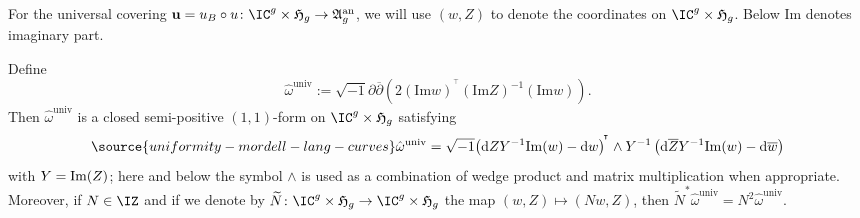 For the universal covering $\mathbf{u} = u_B\circ u \colon \IC^g
\times \mathfrak{H}_g \rightarrow \mathfrak{A}_g^{\mathrm{an}}$, we
will use $(w,Z)$ to denote the coordinates on $\IC^g \times
\mathfrak{H}_g$.
Below $\mathrm{Im}$ denotes imaginary part.


\begin{lemma}
\notready\label{LemmaBettiOnUniversalCovering}
Define
\[
\hat{\omega}^{\mathrm{univ}}:=\sqrt{-1}\partial \overline{\partial} \left( 2 (\mathrm{Im}w)^{\!^{\intercal}} (\mathrm{Im} Z)^{-1} (\mathrm{Im}w) \right).
\]
Then $\hat{\omega}^{\mathrm{univ}}$ is a closed  semi-positive
$(1,1)$-form on $\IC^g\times\mathfrak{H}_g$ satisfying %
\begin{equation}
  \label{eq:bettiformaltformula}
\source{uniformity-mordell-lang-curves}
  \hat{\omega}^{\mathrm{univ}} = \sqrt{-1} \tran{\left( \rmd Z \Y^{-1}
      \mathrm{Im}(w) - \rmd w\right)} \wedge \Y^{-1} \left( \rmd \overline Z \Y^{-1}
    \mathrm{Im}(w) - \rmd \overline w\right)
\end{equation}
with $Y = \mathrm{Im}(Z)$; here and below the symbol $\wedge$
is used as a combination of wedge product and matrix multiplication
when appropriate. %
Moreover, if $N\in\IZ$ and if we denote by $\widetilde{N} \colon \IC^g \times \mathfrak{H}_g \rightarrow \IC^g \times \mathfrak{H}_g$ the map $(w,Z) \mapsto (Nw,Z)$, then $\widetilde{N}^*\hat{\omega}^{\mathrm{univ}} = N^2\hat{\omega}^{\mathrm{univ}}$.
\end{lemma}
